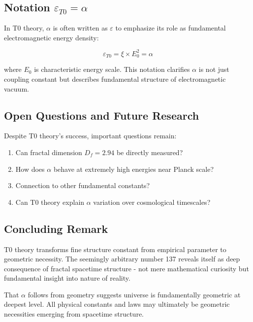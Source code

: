 \documentclass[12pt,a4paper]{article}
\theoremstyle{definition}
\begin{document}
	\subsection{Notation $\varepsilon_{T0} = \alpha$}
	
	In T0 theory, $\alpha$ is often written as $\varepsilon$ to emphasize its role as fundamental electromagnetic energy density:
	
	\begin{equation}
		\varepsilon_{T0} = \xi \times E_0^2 = \alpha
	\end{equation}
	
	where $E_0$ is characteristic energy scale. This notation clarifies $\alpha$ is not just coupling constant but describes fundamental structure of electromagnetic vacuum.
	
	\subsection{Open Questions and Future Research}
	
	Despite T0 theory's success, important questions remain:
	
	\begin{enumerate}
		\item Can fractal dimension $D_f = 2.94$ be directly measured?
		\item How does $\alpha$ behave at extremely high energies near Planck scale?
		\item Connection to other fundamental constants?
		\item Can T0 theory explain $\alpha$ variation over cosmological timescales?
	\end{enumerate}
	
	\subsection{Concluding Remark}
	
	T0 theory transforms fine structure constant from empirical parameter to geometric necessity. The seemingly arbitrary number 137 reveals itself as deep consequence of fractal spacetime structure - not mere mathematical curiosity but fundamental insight into nature of reality.
	
	That $\alpha$ follows from geometry suggests universe is fundamentally geometric at deepest level. All physical constants and laws may ultimately be geometric necessities emerging from spacetime structure.
	
\end{document}
